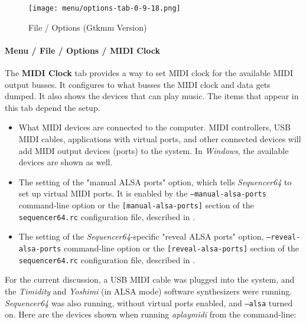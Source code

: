 \begin{figure}[H]
   \centering 
   \texttt{[image: menu/options-tab-0-9-18.png]}
   \caption{File / Options (Gtkmm Version)}
   \label{fig:seq64_options_tab_0_9_18}
\end{figure}

\paragraph{Menu / File / Options / MIDI Clock}
\label{paragraph:seq64_menu_file_options_midi_clock}

   The \textbf{MIDI Clock} tab provides a way to set MIDI clock for
   the available MIDI output busses.
   It configures to what busses the MIDI clock and data gets dumped.
   It also shows the devices that can play music.
   The items that appear in this tab depend the setup.

   \begin{itemize}
      \item What MIDI devices are connected to the computer.
         MIDI controllers, USB MIDI cables, applications with virtual
         ports, and other connected devices will add MIDI
         output devices (ports) to the system.
         In \textsl{Windows}, the available devices are shown as well.
      \item The setting of the "manual ALSA ports" option, which tells
         \textsl{Sequencer64} to set up virtual MIDI ports.
         It is enabled by the
         \texttt{--manual-alsa-ports} command-line option or the
         \texttt{[manual-alsa-ports]} section of the
         \texttt{sequencer64.rc} configuration file, described in
         .
      \item The setting of the \textsl{Sequencer64}-specific
         "reveal ALSA ports" option,
         \texttt{--reveal-alsa-ports} command-line option or the
         \texttt{[reveal-alsa-ports]} section of the
         \texttt{sequencer64.rc} configuration file, described in
         .
   \end{itemize}

   For the current discussion, a USB MIDI cable was plugged into the system,
   and the \textsl{Timidity} and \textsl{Yoshimi} (in ALSA mode) software
   synthesizers were running.  \textsl{Sequencer64} was also running,
   without virtual ports enabled, and \texttt{--alsa} turned on.
   Here are the devices shown when running \textsl{aplaymidi}
   from the command-line:

